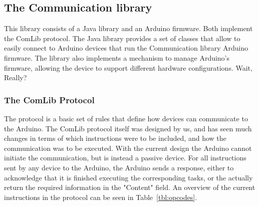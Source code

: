
\newpage

\subsection{The Communication library}
This library consists of a Java library and an Arduino firmware. Both implement the ComLib protocol.
The Java library provides a set of classes that allow to easily connect to Arduino devices that run the Communication library
Arduino firmware. The library also implements a mechanism to manage Arduino's firmware, allowing the device to support
different hardware configurations. Wait, Really?


\subsubsection{The ComLib Protocol}
The protocol is a basic set of rules that define how devices can communicate to the Arduino.
The ComLib protocol itself was designed by us, and has seen much changes in terms of which instructions were to be included,
and how the communication was to be executed. With the current design the Arduino cannot initiate the communication,
but is instead a passive device. For all instructions sent by any device to the Arduino, the Arduino sends a response,
either to acknowledge that it is finished executing the corresponding tasks, or the actually return the required
information in the "Content" field. An overview of the current instructions in the protocol can be seen in Table~\ref{tbl:opcodes}.

